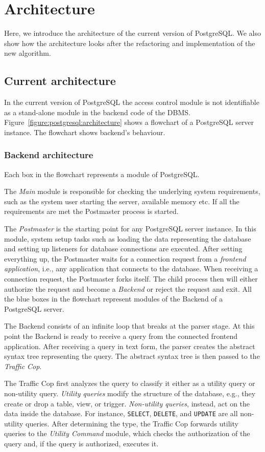 \section{Architecture}


Here, we introduce the architecture of the current version of PostgreSQL.
%
We also show how the architecture looks after the refactoring and implementation of the new algorithm.
%
\subsection{Current architecture}
%
In the current version of PostgreSQL the access control module is not identifiable as a stand-alone module in the backend code of the DBMS.
%
Figure~\ref{figure:postgresql:architecture} shows a flowchart of a PostgreSQL server instance.
%
The flowchart shows backend's behaviour.
%
\subsubsection{Backend architecture}
%
Each box in the flowchart represents a module of PostgreSQL.

The \emph{Main} module is responsible for checking the underlying system requirements, such as the system user starting the server, available memory etc. If all the requirements are met the {Postmaster} process is started.

The \emph{Postmaster} is the starting point for any PostgreSQL server instance. 
%
In this module, system setup tasks such as loading the data representing the database and setting up listeners for database connections are executed.
%
After setting everything up, the Postmaster waits for a connection request from a \emph{frontend application}, i.e., any application that connects to the database.
%
When receiving a connection request, the Postmaster forks itself.
%
The child process then will either authorize the request and become a \emph{Backend} or reject the request and exit.
%
All the blue boxes in the flowchart represent modules of the Backend of a PostgreSQL server.

The Backend consists of an infinite loop that breaks at the parser stage.
%
At this point the Backend is ready to receive a query from the connected frontend application.
%
After receiving a query in text form, the parser creates the abstract syntax tree representing the query.
%
The abstract syntax tree is then passed to the \emph{Traffic Cop}.

The Traffic Cop first analyzes the query to classify it either as a {utility query} or {non-utility query}.
%
\emph{Utility queries} modify the structure of the database, e.g., they create or drop a table, view, or  trigger.
%
\emph{Non-utility queries}, instead, act on the data inside the database.
%
For instance, \texttt{SELECT}, \texttt{DELETE}, and \texttt{UPDATE} are all non-utility queries. 
%
After determining the type, the Traffic Cop forwards utility queries to the \emph{Utility Command} module, which checks the authorization of the query and, if the query is authorized, executes it.

